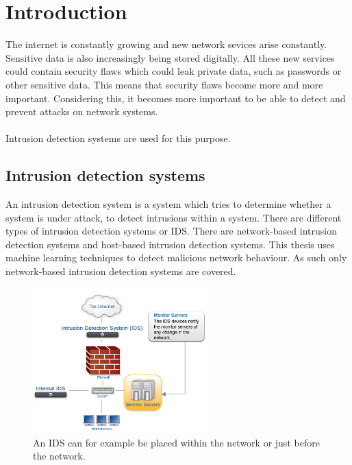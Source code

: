 
\chapter{Introduction} %

\label{Chapter1} %

The internet is constantly growing and new network sevices arise constantly. Sensitive data is also increasingly being stored digitally. All these new services could contain security flaws which could leak private data, such as passwords or other sensitive data. This means that security flaws become more and more important. Considering this, it becomes more important to be able to detect and prevent attacks on network systems. \\\\
Intrusion detection systems are used for this purpose. 

\section{Intrusion detection systems}
An intrusion detection system is a system which tries to determine whether a system is under attack, to detect intrusions within a system. There are different types of intrusion detection systems or IDS. There are network-based intrusion detection systems and host-based intrusion detection systems. This thesis uses machine learning techniques to detect malicious network behaviour. As such only network-based intrusion detection systems are covered.
\begin{figure}[H]
\centering
\includegraphics[width=0.6\textwidth]{Figures/idsdiagram}
\decoRule
\caption[Possible placement of IDS]{An IDS can for example be placed within the network or just before the network.}
\label{fig:IDS}
\end{figure}
